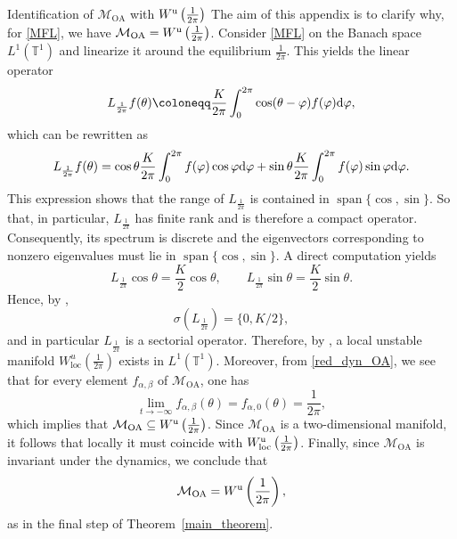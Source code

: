 \documentclass{article}
\theoremstyle{definition}
\newcommand{\T}{\mathbb{T}}
\renewcommand{\u}{\textnormal{u}}
\renewcommand{\d}{\textnormal{d}}
\newcommand{\OA}{\mathcal{M}_{\mathrm{OA}}}
\begin{document}
\begin{section}{Identification of $\OA$ with $W^\u\left(\frac{1}{2\pi}\right)$}\label{App_C}
The aim of this appendix is to clarify why, for \eqref{MFL}, we have $\OA=W^\u\left(\frac{1}{2\pi}\right)$. Consider \eqref{MFL} on the Banach space $L^1(\T^1)$ and linearize it around the equilibrium $\frac{1}{2\pi}$. This yields the linear operator
$$L_{\frac{1}{2\pi}}f(\theta)\coloneqq\frac{K}{2\pi}\int_0^{2\pi}\cos(\theta-\varphi)f(\varphi)\d \varphi,$$
which can be rewritten as
$$L_{\frac{1}{2\pi}}f(\theta)
=\cos\theta\frac{K}{2\pi}\int_0^{2\pi}f(\varphi)\cos\varphi\d \varphi
+\sin\theta\frac{K}{2\pi}\int_0^{2\pi}f(\varphi)\sin\varphi\d \varphi.$$
This expression shows that the range of $L_{\frac{1}{2\pi}}$ is contained in $\operatorname{span}\{\cos,\sin\}$. So that, in particular, $L_{\frac{1}{2\pi}}$ has finite rank and is therefore a compact operator. Consequently, its spectrum is discrete and the eigenvectors corresponding to nonzero eigenvalues must lie in $\operatorname{span}\{\cos,\sin\}$. A direct computation yields
$$L_{\frac{1}{2\pi}}\cos\theta=\frac{K}{2}\cos\theta,\qquad 
L_{\frac{1}{2\pi}}\sin\theta=\frac{K}{2}\sin\theta.$$
Hence, by \cite[Theorem 6.8]{brezis2011functional},
$$\sigma\left(L_{\frac{1}{2\pi}}\right)=\{0,K/2\},$$
and in particular $L_{\frac{1}{2\pi}}$ is a sectorial operator. Therefore, by \cite[Lemma 71.2]{sell2002dynamics}, a local unstable manifold $W^u_{\mathrm{loc}}\left(\frac{1}{2\pi}\right)$ exists in $L^1(\T^1)$. Moreover, from \eqref{red_dyn_OA}, we see that for every element $f_{\alpha,\beta}$ of $\OA$, one has
$$\lim_{t\rightarrow-\infty}f_{\alpha,\beta}(\theta)
=f_{\alpha,0}(\theta)=\frac{1}{2\pi},$$
which implies that $\OA\subseteq W^\u\left(\frac{1}{2\pi}\right)$. Since $\OA$ is a two-dimensional manifold, it follows that locally it must coincide with $W^\u_{\mathrm{loc}}\left(\frac{1}{2\pi}\right)$. Finally, since $\OA$ is invariant under the dynamics, we conclude that
$$\OA=W^\u\left(\frac{1}{2\pi}\right),$$
as in the final step of Theorem~\ref{main_theorem}.
\end{section}
\end{document}
